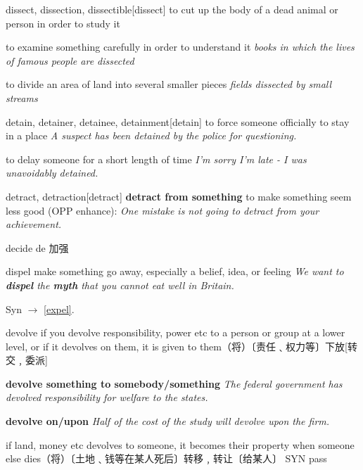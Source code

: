 \begin{DefWord}{dissect, dissection, dissectible}[dissect]
    to cut up the body of a dead animal or person in order to study it

    to examine something carefully in order to understand it
    \textit{books in which the lives of famous people are dissected}

    to divide an area of land into several smaller pieces
    \textit{fields dissected by small streams}
\end{DefWord}

\begin{DefWord}{detain, detainer, detainee, detainment}[detain]
    to force someone officially to stay in a place
    \textit{A suspect has been detained by the police for questioning.}

    to delay someone for a short length of time
\textit{I'm sorry I'm late - I was unavoidably detained.}
\end{DefWord}

\begin{DefWord}{detract, detraction}[detract]
    \textbf{detract from something}
    to make something seem less good (OPP  enhance):
    \textit{One mistake is not going to detract from your achievement.}
\end{DefWord}

\begin{DefWord}{decide}
    de 加强
\end{DefWord}

\begin{DefWord}{dispel}
    make something go away, especially a belief, idea, or feeling
    \textit{We want to \textbf{dispel} the \textbf{myth} that you cannot eat well in Britain.}

    Syn $\rightarrow$ \ref{expel}.
\end{DefWord}

\begin{DefWord}{devolve}
    if you devolve responsibility, power etc to a person or group at a lower level, or if it devolves on them, it is given to them（将）〔责任﹑权力等〕下放[转交﹐委派]

    \textbf{devolve something to somebody/something}
    \textit{The federal government has devolved responsibility for welfare to the states.}

    \textbf{devolve on/upon}
    \textit{Half of the cost of the study will devolve upon the firm.}

    if land, money etc devolves to someone, it becomes their property when someone else dies（将）〔土地﹑钱等在某人死后〕转移﹐转让〔给某人〕 SYN  pass
\end{DefWord}

